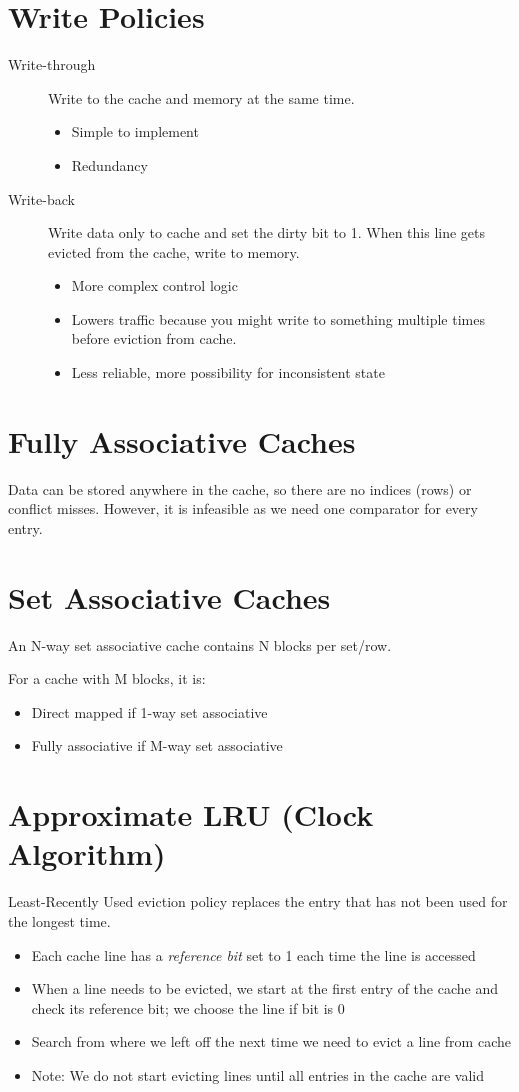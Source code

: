 \section{Write Policies}
\begin{description}
	\item[Write-through] Write to the cache and memory at the same time.
		\begin{itemize}
			\item Simple to implement
			\item Redundancy
		\end{itemize}
	\item[Write-back] Write data only to cache and set the dirty bit to 1. When this line gets evicted from the cache, write to memory.
		\begin{itemize}
			\item More complex control logic
			\item Lowers traffic because you might write to something multiple times before eviction from cache.
			\item Less reliable, more possibility for inconsistent state
		\end{itemize}
\end{description}

\section{Fully Associative Caches}
Data can be stored anywhere in the cache, so there are no indices (rows) or conflict misses. However, it is infeasible as we need one comparator for every entry.

\section{Set Associative Caches}
An N-way set associative cache contains N blocks per set/row.

For a cache with M blocks, it is:
\begin{itemize}
    \item Direct mapped if 1-way set associative
    \item Fully associative if M-way set associative
\end{itemize}

\section{Approximate LRU (Clock Algorithm)}
Least-Recently Used eviction policy replaces the entry that has not been used for the longest time.
\begin{itemize}
    \item Each cache line has a \emph{reference bit} set to 1 each time the line is accessed
    \item When a line needs to be evicted, we start at the first entry of the cache and check its reference bit; we choose the line if bit is 0
    \item Search from where we left off the next time we need to evict a line from cache
    \item Note: We do not start evicting lines until all entries in the cache are valid
\end{itemize}